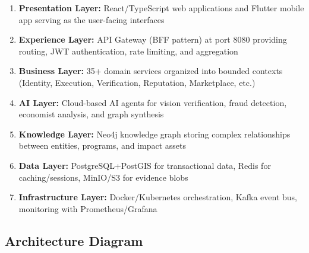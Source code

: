 \documentclass[11pt,a4paper]{article}
\begin{document}
\begin{enumerate}
  \item \textbf{Presentation Layer:} React/TypeScript web applications and Flutter mobile app serving as the user-facing interfaces
  \item \textbf{Experience Layer:} API Gateway (BFF pattern) at port 8080 providing routing, JWT authentication, rate limiting, and aggregation
  \item \textbf{Business Layer:} 35+ domain services organized into bounded contexts (Identity, Execution, Verification, Reputation, Marketplace, etc.)
  \item \textbf{AI Layer:} Cloud-based AI agents for vision verification, fraud detection, economist analysis, and graph synthesis
  \item \textbf{Knowledge Layer:} Neo4j knowledge graph storing complex relationships between entities, programs, and impact assets
  \item \textbf{Data Layer:} PostgreSQL+PostGIS for transactional data, Redis for caching/sessions, MinIO/S3 for evidence blobs
  \item \textbf{Infrastructure Layer:} Docker/Kubernetes orchestration, Kafka event bus, monitoring with Prometheus/Grafana
\end{enumerate}

\subsection{Architecture Diagram}
\end{document}
